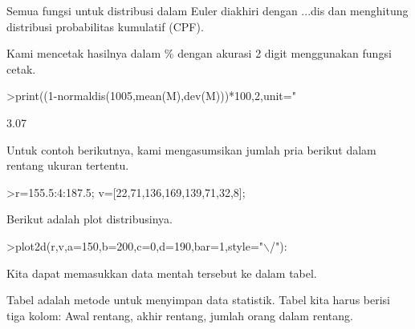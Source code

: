 \documentclass[a4paper,10pt]{article}
\begin{document}
\begin{eulernotebook}
\begin{eulercomment}
\begin{eulercomment}
\begin{eulercomment}
\begin{eulercomment}
\begin{eulercomment}
\begin{eulercomment}
\begin{eulercomment}
Semua fungsi untuk distribusi dalam Euler diakhiri dengan ...dis dan
menghitung distribusi probabilitas kumulatif (CPF).

Kami mencetak hasilnya dalam \% dengan akurasi 2 digit menggunakan
fungsi cetak.
\end{eulercomment}
\begin{eulerprompt}
>print((1-normaldis(1005,mean(M),dev(M)))*100,2,unit=" %
\end{eulerprompt}
\begin{euleroutput}
        3.07 %
\end{euleroutput}
\begin{eulercomment}
Untuk contoh berikutnya, kami mengasumsikan jumlah pria berikut dalam
rentang ukuran tertentu.
\end{eulercomment}
\begin{eulerprompt}
>r=155.5:4:187.5; v=[22,71,136,169,139,71,32,8];
\end{eulerprompt}
\begin{eulercomment}
Berikut adalah plot distribusinya.
\end{eulercomment}
\begin{eulerprompt}
>plot2d(r,v,a=150,b=200,c=0,d=190,bar=1,style="\(\backslash\)/"):
\end{eulerprompt}
\begin{eulercomment}
Kita dapat memasukkan data mentah tersebut ke dalam tabel.

Tabel adalah metode untuk menyimpan data statistik. Tabel kita harus
berisi tiga kolom: Awal rentang, akhir rentang, jumlah orang dalam
rentang.


\end{eulercomment}
\end{eulercomment}
\end{eulercomment}
\end{eulercomment}
\end{eulercomment}
\end{eulercomment}
\end{eulercomment}
\end{eulernotebook}
\end{document}
